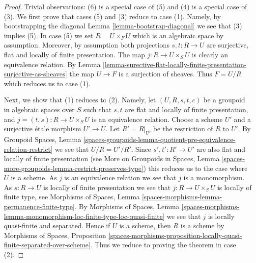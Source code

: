 \begin{proof}
Trivial observations: (6) is a special case of (5) and
(4) is a special case of (3).
We first prove that cases (5) and (3) reduce to case (1).
Namely, by bootstrapping the diagonal
Lemma \ref{lemma-bootstrap-diagonal}
we see that (3) implies (5). In case (5) we set $R = U \times_F U$ which
is an algebraic space by assumption. Moreover, by assumption both
projections $s, t : R \to U$ are surjective, flat and locally of
finite presentation. The map $j : R \to U \times_S U$ is clearly an
equivalence relation. By
Lemma
\ref{lemma-surective-flat-locally-finite-presentation-surjective-as-sheaves}
the map $U \to F$ is a surjection of sheaves. Thus $F = U/R$
which reduces us to case (1).

\medskip\noindent
Next, we show that (1) reduces to (2).
Namely, let $(U, R, s, t, c)$ be a groupoid in algebraic spaces
over $S$ such that $s, t$ are flat and locally of finite presentation, and
$j = (t, s) : R \to U \times_S U$ is an equivalence relation.
Choose a scheme $U'$ and a surjective \'etale morphism $U' \to U$.
Let $R' = R|_{U'}$ be the restriction of $R$ to $U'$. By
Groupoid Spaces,
Lemma \ref{spaces-groupoids-lemma-quotient-pre-equivalence-relation-restrict}
we see that $U/R = U'/R'$. Since $s', t' : R' \to U'$ are also
flat and locally of finite presentation (see
More on Groupoids in Spaces,
Lemma \ref{spaces-more-groupoids-lemma-restrict-preserves-type})
this reduces us to the case where $U$ is a scheme.
As $j$ is an equivalence relation we see that $j$ is a monomorphism.
As $s : R \to U$ is locally of finite presentation we see that
$j : R \to U \times_S U$ is locally of finite type, see
Morphisms of Spaces, Lemma \ref{spaces-morphisms-lemma-permanence-finite-type}.
By
Morphisms of Spaces, Lemma
\ref{spaces-morphisms-lemma-monomorphism-loc-finite-type-loc-quasi-finite}
we see that $j$ is locally quasi-finite and separated.
Hence if $U$ is a scheme, then $R$ is a scheme by
Morphisms of Spaces, Proposition
\ref{spaces-morphisms-proposition-locally-quasi-finite-separated-over-scheme}.
Thus we reduce to proving the theorem in case (2).


\end{proof}
